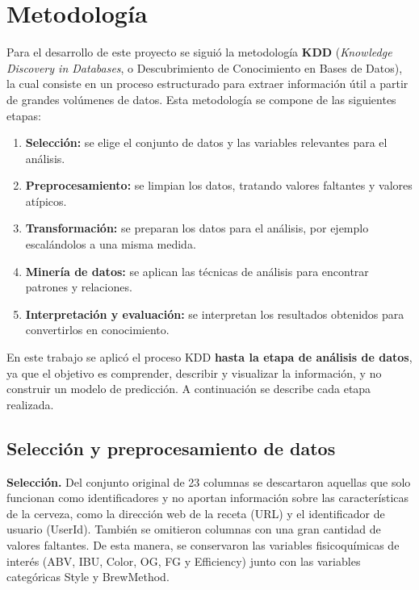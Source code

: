 \documentclass[11pt]{article}
\begin{document}
\section{Metodología}

Para el desarrollo de este proyecto se siguió la metodología \textbf{KDD}
(\textit{Knowledge Discovery in Databases}, o Descubrimiento de Conocimiento en
Bases de Datos), la cual consiste en un proceso estructurado para extraer
información útil a partir de grandes volúmenes de datos. Esta metodología se
compone de las siguientes etapas:

\begin{enumerate}
    \item \textbf{Selección:} se elige el conjunto de datos y las variables
    relevantes para el análisis.
    \item \textbf{Preprocesamiento:} se limpian los datos, tratando valores
    faltantes y valores atípicos.
    \item \textbf{Transformación:} se preparan los datos para el análisis, por
    ejemplo escalándolos a una misma medida.
    \item \textbf{Minería de datos:} se aplican las técnicas de análisis para
    encontrar patrones y relaciones.
    \item \textbf{Interpretación y evaluación:} se interpretan los resultados
    obtenidos para convertirlos en conocimiento.
\end{enumerate}

En este trabajo se aplicó el proceso KDD \textbf{hasta la etapa de análisis de
datos}, ya que el objetivo es comprender, describir y visualizar la información,
y no construir un modelo de predicción. A continuación se describe cada etapa
realizada.

\subsection{Selección y preprocesamiento de datos}

\textbf{Selección.} Del conjunto original de 23 columnas se descartaron aquellas
que solo funcionan como identificadores y no aportan información sobre las
características de la cerveza, como la dirección web de la receta (URL) y el
identificador de usuario (UserId). También se omitieron columnas con una gran
cantidad de valores faltantes. De esta manera, se conservaron las variables
fisicoquímicas de interés (ABV, IBU, Color, OG, FG y Efficiency) junto con las
variables categóricas Style y BrewMethod.
\end{document}
